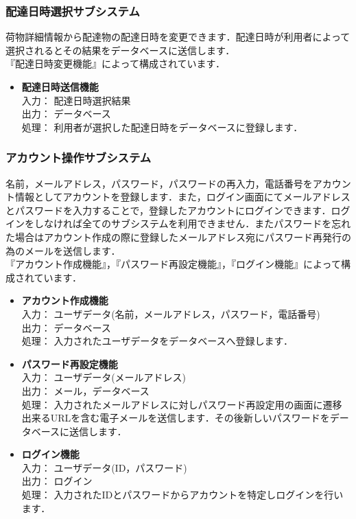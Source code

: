 \documentclass[a4j,titlepage]{jarticle}
\begin{document}
\subsubsection{配達日時選択サブシステム}
荷物詳細情報から配達物の配達日時を変更できます．配達日時が利用者によって選択されるとその結果をデータベースに送信します．\\
『配達日時変更機能』によって構成されています．
\begin{itemize}
\item \textbf{配達日時送信機能} \\
入力： 配達日時選択結果\\
出力： データベース \\
処理： 利用者が選択した配達日時をデータベースに登録します．
\end{itemize}

\subsubsection{アカウント操作サブシステム}
名前，メールアドレス，パスワード，パスワードの再入力，電話番号をアカウント情報としてアカウントを登録します．また，ログイン画面にてメールアドレスとパスワードを入力することで，登録したアカウントにログインできます．ログインをしなければ全てのサブシステムを利用できません．またパスワードを忘れた場合はアカウント作成の際に登録したメールアドレス宛にパスワード再発行の為のメールを送信します． \\
『アカウント作成機能』，『パスワード再設定機能』，『ログイン機能』によって構成されています．

\begin{itemize}
\item \textbf{アカウント作成機能} \\
入力： ユーザデータ(名前，メールアドレス，パスワード，電話番号) \\
出力： データベース \\
処理： 入力されたユーザデータをデータベースへ登録します．
\item \textbf{パスワード再設定機能} \\
入力： ユーザデータ(メールアドレス) \\
出力： メール，データベース \\
処理： 入力されたメールアドレスに対しパスワード再設定用の画面に遷移出来るURLを含む電子メールを送信します．その後新しいパスワードをデータベースに送信します．
\item \textbf{ログイン機能} \\
入力： ユーザデータ(ID，パスワード) \\
出力： ログイン \\
処理： 入力されたIDとパスワードからアカウントを特定しログインを行います．
\end{itemize}
\end{document}
